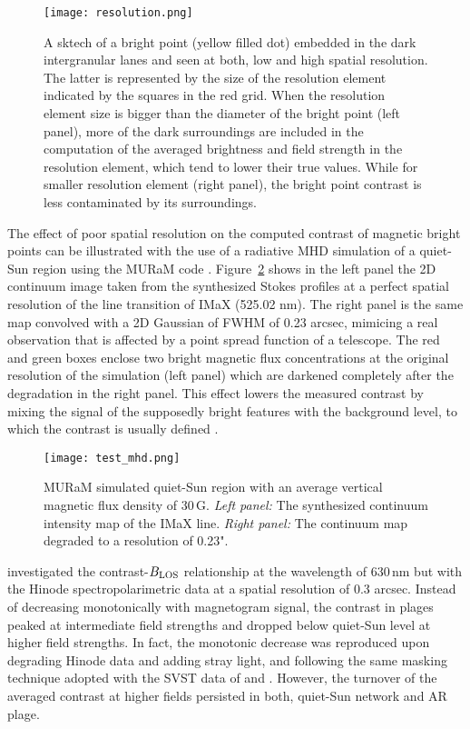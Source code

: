 \documentclass[goettingen, gauss, print]{thesis}
\begin{document}
\begin{figure}
\centering
\hspace*{-0.5cm}\texttt{[image: resolution.png]}
\caption{A sktech of a bright point (yellow filled dot) embedded in the dark intergranular lanes and seen at both, low and high spatial resolution. The latter is represented by the size of the resolution element indicated by the squares in the red grid. When the resolution element size is bigger than the diameter of the bright point (left panel), more of the dark surroundings are included in the computation of the averaged brightness and field strength in the resolution element, which tend to lower their true values. While for smaller resolution element (right panel), the bright point contrast is less contaminated by its surroundings.}
\label{resolution}
\end{figure}

The effect of poor spatial resolution on the computed contrast of magnetic bright points can be illustrated with the use of a radiative MHD simulation of a quiet-Sun region using the MURaM code \citep{vogler_simulations_2005}. Figure~\ref{30G_MHD} shows in the left panel the 2D continuum image taken from the synthesized Stokes profiles at a perfect spatial resolution of the line transition of IMaX (525.02 nm). The right panel is the same map convolved with a 2D Gaussian of FWHM of 0.23 arcsec, mimicing a real observation that is affected by a point spread function of a telescope. The red and green boxes enclose two bright magnetic flux concentrations at the original resolution of the simulation (left panel) which are darkened completely after the degradation in the right panel. This effect lowers the measured contrast by mixing the signal of the supposedly bright features with the background level, to which the contrast is usually defined \citep{schnerr_brightness_2011}. 

\begin{figure}
\centering
\hspace*{-1cm}\texttt{[image: test\_mhd.png]}
\caption{MURaM simulated quiet-Sun region with an average vertical magnetic flux density of 30\,G. \textit{Left panel:} The synthesized continuum intensity map of the IMaX line. \textit{Right panel:} The continuum map degraded to a resolution of 0.23". }
\label{30G_MHD}

\end{figure} 

\cite{kobel_continuum_2011} investigated the contrast-$B_{\rm LOS}$ relationship at the wavelength of 630\,nm but with the Hinode spectropolarimetric data at a spatial resolution of 0.3 arcsec. Instead of decreasing monotonically with magnetogram signal, the contrast in plages peaked at intermediate field strengths and dropped below quiet-Sun level at higher field strengths. 
In fact, the monotonic decrease was reproduced upon degrading Hinode data and adding stray light, and following the same masking technique adopted with the SVST data of \cite{topka_properties_1992} and \cite{title_differences_1992}. However, the turnover of the averaged contrast at higher fields persisted in both, quiet-Sun network and AR plage.
\end{document}
